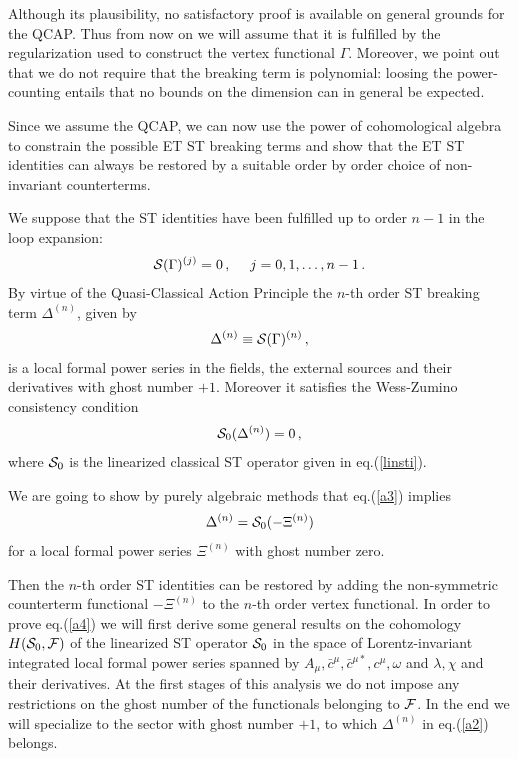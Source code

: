 \documentclass[a4paper,11pt]{article}
\def\G{\Gamma}
\begin{document}
Although its
 plausibility, no satisfactory proof is available on general grounds
 for the QCAP.
Thus from now on we will assume that it is fulfilled by the regularization
 used to construct the vertex functional $\G$.
Moreover, we point out that we do not require that
 the breaking term is polynomial:
 loosing the power-counting entails that no bounds on the dimension
 can in general be expected.

Since we assume the QCAP, we can now use the power of cohomological
 algebra to constrain the possible ET ST breaking terms and show
 that the ET ST identities can always be restored by a suitable order by order
 choice of non-invariant counterterms.

We suppose that the ST identities have been fulfilled up to order $n-1$
in the loop expansion:
%
\begin{eqnarray}
{\cal S}(\G)^{(j)} = 0 \, , ~~~~ j=0,1,\dots,n-1 \, .
\label{a1}
\end{eqnarray}
%
By virtue of the Quasi-Classical Action Principle 
the $n$-th order ST breaking term $\Delta^{(n)}$, given by
%
\begin{eqnarray}
\Delta^{(n)} \equiv {\cal S}(\G)^{(n)} \, , 
\label{a2}
\end{eqnarray}
%
is a local formal power series in the fields, the external sources
and their derivatives with ghost number $+1$. Moreover it satisfies 
the Wess-Zumino consistency condition \cite{Piguet:er,Wess:yu}
%
\begin{eqnarray}
{\cal S}_0 (\Delta^{(n)}) = 0 \, , 
\label{a3}
\end{eqnarray}
%
where ${\cal S}_0$ is the linearized classical ST operator given 
in eq.(\ref{linsti}).

We are going to show by purely algebraic methods that 
eq.(\ref{a3}) implies
%
\begin{eqnarray}
\Delta^{(n)} = {\cal S}_0 (-\Xi^{(n)}) 
\label{a4}
\end{eqnarray}
%
for a local formal power series $\Xi^{(n)}$ with ghost number zero.

Then the $n$-th order ST identities can  be restored by adding 
the non-symmetric counterterm functional
 $-\Xi^{(n)}$ to the $n$-th order vertex functional.
%
In order to prove eq.(\ref{a4}) we will first derive
some general results on the cohomology $H({\cal S}_0,{\cal F})$ 
of the linearized ST operator ${\cal S}_0$ in the space
of Lorentz-invariant integrated local formal power series
spanned by $A_\mu,\bar c^\mu, {\bar c}^{\mu*}, c^\mu,\omega$ and $\lambda,\chi$ and their derivatives.
At the first stages of this analysis we do not impose any restrictions
on the ghost number  of the functionals belonging to ${\cal F}$. In the end
we will specialize to the sector with ghost number $+1$, to which
$\Delta^{(n)}$ in eq.(\ref{a2}) belongs. 
\end{document}
